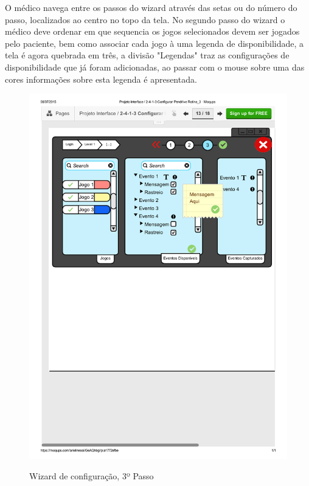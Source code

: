 \documentclass[12pt]{article}
\begin{document}
O médico navega entre os passos do wizard através das setas ou do número do passo, localizados ao centro no topo da tela. No segundo passo do wizard o médico deve ordenar em que sequencia os jogos selecionados devem ser jogados pelo paciente, bem como associar cada jogo à uma legenda de disponibilidade, a tela é agora quebrada em três, a divisão "Legendas" traz as configurações de disponibilidade que já foram adicionadas, ao passar com o mouse sobre uma das cores informações sobre esta legenda é apresentada.
\begin{figure}[h]
\centering
\includegraphics[scale=0.6]{imagens/2-4-1-3Configurar_Pendrive_Rotina_3.pdf}
\label{wizard3}
\caption{Wizard de configuração, 3º Passo}
\end{figure}
\end{document}
